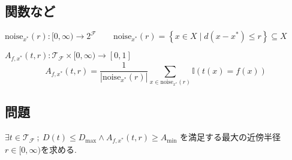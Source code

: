\documentclass[dvipdfmx,10.5pt]{jsarticle}
\newcommand{\noise}{\mathrm{noise}}
\newcommand{\depth}{D}
\newcommand{\dist}{d}
\newcommand{\NNR}{[0,\infty)}
\newcommand{\mywidth}{\widthof{\bfseries データセットのサイズ }}
\numberwithin{equation}{part}
\begin{document}
\subsection{関数など}
\begin{description}[leftmargin=!,labelwidth=\mywidth]
  \item[\underline{ノイズ集合}] 
  $
    \noise_{x^*}(r):\NNR\to2^\mathcal{F}\quad\quad
    \noise_{x^*}(r)=\left\{x\in X\mid\dist(x-x^*)\le r\right\}\subseteq X
  $
\end{description}
\begin{description}[leftmargin=!,labelwidth=\mywidth]
  \item[\underline{近似精度}]
  $A_{f,x^*}(t,r):\mathcal{T}_\mathcal{F}\times\NNR\to[0,1]$
  $$
    A_{f,x^*}(t,r)=\frac{1}{|\noise_{x^*}(r)|}
    \sum_{x\in\noise_{x^*}(r)}\mathbb{I}(t(x)=f(x))
  $$
\end{description}

\subsection{問題}
$
  \exists t\in \mathcal{T}_\mathcal{F}\ ;
  \ \depth(t)\le \depth_\mathrm{max}\wedge
  A_{f,x^*}(t,r)\ge A_\mathrm{min}
$
を満足する最大の近傍半径$r\in\NNR$を求める. 
\end{document}
